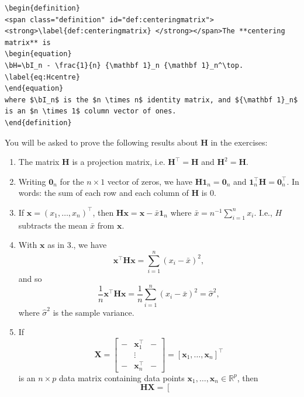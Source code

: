 \documentclass[]{book}
\providecommand{\tightlist}{%
  \setlength{\itemsep}{0pt}\setlength{\parskip}{0pt}}
\theoremstyle{definition}
\newtheorem{definition}{Definition}[chapter]
\theoremstyle{definition}
\theoremstyle{definition}
\theoremstyle{remark}
\begin{document}
\begin{verbatim}
\begin{definition}
<span class="definition" id="def:centeringmatrix"><strong>\label{def:centeringmatrix} </strong></span>The **centering matrix** is 
\begin{equation}
\bH=\bI_n - \frac{1}{n} {\mathbf 1}_n {\mathbf 1}_n^\top.
\label{eq:Hcentre}
\end{equation}
where $\bI_n$ is the $n \times n$ identity matrix, and ${\mathbf 1}_n$ is an $n \times 1$ column vector of ones.
\end{definition}
\end{verbatim}

You will be asked to prove the following results about \(\boldsymbol H\) in the exercises:

\begin{enumerate}
\def\labelenumi{\arabic{enumi}.}
\tightlist
\item
  The matrix \(\boldsymbol H\) is a projection matrix, i.e. \(\boldsymbol H^\top =\boldsymbol H\) and \(\boldsymbol H^2=\boldsymbol H\).
\item
  Writing \({\mathbf 0}_n\) for the \(n \times 1\) vector of zeros, we have
  \(\boldsymbol H{\mathbf 1}_n={\mathbf 0}_n\) and \({\mathbf 1}_n^\top \boldsymbol H={\mathbf 0}_n^\top.\) In words: the sum of each row and each column of \(\boldsymbol H\) is \(0\).
\item
  If \(\boldsymbol x=(x_1, \ldots , x_n)^\top\), then \(\boldsymbol H\boldsymbol x= \boldsymbol x- \bar{x}{\mathbf 1}_n\) where \(\bar{x}=n^{-1}\sum_{i=1}^n x_i\). I.e., \(H\) subtracts the mean \(\bar{x}\) from \(\boldsymbol x\).
\item
  With \(\boldsymbol x\) as in 3., we have
  \[
  \boldsymbol x^\top \boldsymbol H\boldsymbol x= \sum_{i=1}^n (x_i-\bar{x})^2,
  \]
  and so
  \[
  \frac{1}{n}\boldsymbol x^\top \boldsymbol H\boldsymbol x=\frac{1}{n}\sum_{i=1}^n (x_i-\bar{x})^2 = \hat{\sigma}^2,
  \]
  where \(\hat{\sigma}^2\) is the sample variance.
\item
  If
  \[\boldsymbol X=\left[\begin{array}{ccc}-&\boldsymbol x_1^\top&-\\ 
  &\vdots& \\ -&\boldsymbol x_n^\top&-\end{array}\right] = [\boldsymbol x_1, \ldots, \boldsymbol x_n]^\top\]
  is an \(n \times p\) data matrix containing data points \(\boldsymbol x_1, \ldots, \boldsymbol x_n\in \mathbb{R}^p\), then
  \[
  \boldsymbol H\boldsymbol X=\left[ \begin{array}{ccc}

\end{array}\]
\end{enumerate}
\end{document}
